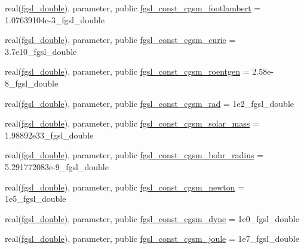\begin{DoxyCompactItemize}
\item 
real(\hyperlink{namespacefgsl_a9af5113378e0f000eb479d3f90196ddf}{fgsl\+\_\+double}), parameter, public \hyperlink{namespacefgsl_a392158d18a3d487acc9ed9d88636066c}{fgsl\+\_\+const\+\_\+cgsm\+\_\+footlambert} = 1.\+07639104e-\/3\+\_\+fgsl\+\_\+double
\item 
real(\hyperlink{namespacefgsl_a9af5113378e0f000eb479d3f90196ddf}{fgsl\+\_\+double}), parameter, public \hyperlink{namespacefgsl_a1a2ad0a32e7001630dc57fb05a13896b}{fgsl\+\_\+const\+\_\+cgsm\+\_\+curie} = 3.\+7e10\+\_\+fgsl\+\_\+double
\item 
real(\hyperlink{namespacefgsl_a9af5113378e0f000eb479d3f90196ddf}{fgsl\+\_\+double}), parameter, public \hyperlink{namespacefgsl_a081808c3b3b7297c71e015034c089d04}{fgsl\+\_\+const\+\_\+cgsm\+\_\+roentgen} = 2.\+58e-\/8\+\_\+fgsl\+\_\+double
\item 
real(\hyperlink{namespacefgsl_a9af5113378e0f000eb479d3f90196ddf}{fgsl\+\_\+double}), parameter, public \hyperlink{namespacefgsl_aa616f1f47c1a107f10dcb7418517b723}{fgsl\+\_\+const\+\_\+cgsm\+\_\+rad} = 1e2\+\_\+fgsl\+\_\+double
\item 
real(\hyperlink{namespacefgsl_a9af5113378e0f000eb479d3f90196ddf}{fgsl\+\_\+double}), parameter, public \hyperlink{namespacefgsl_a41afd20c5be47db2d713c42cac018572}{fgsl\+\_\+const\+\_\+cgsm\+\_\+solar\+\_\+mass} = 1.\+98892e33\+\_\+fgsl\+\_\+double
\item 
real(\hyperlink{namespacefgsl_a9af5113378e0f000eb479d3f90196ddf}{fgsl\+\_\+double}), parameter, public \hyperlink{namespacefgsl_a61da4815b82a64d0b0a2a5737ee854f5}{fgsl\+\_\+const\+\_\+cgsm\+\_\+bohr\+\_\+radius} = 5.\+291772083e-\/9\+\_\+fgsl\+\_\+double
\item 
real(\hyperlink{namespacefgsl_a9af5113378e0f000eb479d3f90196ddf}{fgsl\+\_\+double}), parameter, public \hyperlink{namespacefgsl_a1130bb96c29d828c350ca8882cac2a6d}{fgsl\+\_\+const\+\_\+cgsm\+\_\+newton} = 1e5\+\_\+fgsl\+\_\+double
\item 
real(\hyperlink{namespacefgsl_a9af5113378e0f000eb479d3f90196ddf}{fgsl\+\_\+double}), parameter, public \hyperlink{namespacefgsl_a9d4d18eee80940b4fda61ccf8eb7a0a1}{fgsl\+\_\+const\+\_\+cgsm\+\_\+dyne} = 1e0\+\_\+fgsl\+\_\+double
\item 
real(\hyperlink{namespacefgsl_a9af5113378e0f000eb479d3f90196ddf}{fgsl\+\_\+double}), parameter, public \hyperlink{namespacefgsl_adea52d494e1c4e17f003736bd07eb592}{fgsl\+\_\+const\+\_\+cgsm\+\_\+joule} = 1e7\+\_\+fgsl\+\_\+double
\item 

\end{DoxyCompactItemize}
